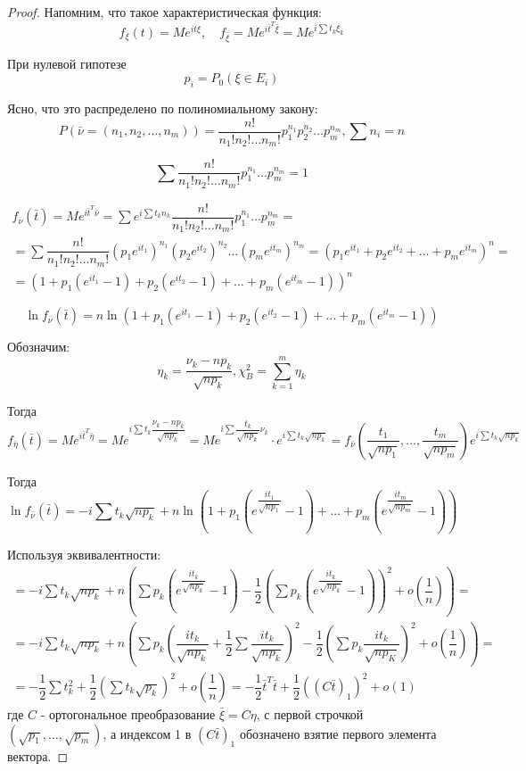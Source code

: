\begin{proof}
  Напомним, что такое характеристическая функция:
  \[
    f_\xi (t) = M e^{i t \xi},\quad f_{\bar \xi} = M e^{i \bar t^T \bar \xi} = M e^{i \sum t_k \xi_k}
  \]

  При нулевой гипотезе
  \[
    p_i = P_0 (\xi \in E_i)
  \]

  Ясно, что это распределено по полиномиальному закону:
  \[
    P(\bar \nu = (n_1, n_2, \dots, n_m)) = \dfrac{n!}{n_1! n_2! \dots n_m!} p_1^{n_1} p_2^{n_2} \dots p_m^{n_m}, \sum n_i = n
  \]

  \[
    \sum \dfrac{n!}{n_1! n_2! \dots n_m!} p_1^{n_1} \dots p_m^{n_m} = 1
  \]

  \begin{multline*}
    f_{\bar \nu} (\bar t) = M e^{i \bar t^T \bar \nu} =
    \sum e^{i \sum t_k n_k} \dfrac{n!}{n_1! n_2! \dots n_m!} p_1^{n_1} \dots p_m^{n_m} = \\
    = \sum \dfrac{n!}{n_1! n_2! \dots n_m!} (p_1 e^{i t_1})^{n_1} (p_2 e^{i t_2})^{n_2} \dots (p_m e^{i t_m})^{n_m} = 
    (p_1 e^{i t_1} + p_2 e^{i t_2} + \dots + p_m e^{i t_m})^n = \\
    = (1 + p_1 (e^{i t_1} - 1) + p_2 (e^{i t_2} - 1) + \dots + p_m (e^{i t_m} - 1))^n
  \end{multline*}

  \[
    \ln f_{\bar \nu} (\bar t) = n \ln (1 + p_1 (e^{i t_1} - 1) + p_2 (e^{i t_2} - 1) + \dots + p_m (e^{i t_m} - 1))
  \]

  Обозначим: 
  \[
    \eta_k = \dfrac{\nu_k - np_k}{\sqrt{np_k}}, \chi^2_B = \sum_{k=1}^m \eta_k
  \]

  Тогда
  \[
    f_{\bar \eta} (\bar t) = M e^{i \bar t^T \bar \eta} =
    M e^{i \sum t_k \dfrac{\nu_k - np_k}{\sqrt{np_k}}} = 
    M e^{i \sum \dfrac{t_k}{\sqrt{np_k}} \nu_k} \cdot e^{i \sum t_k \sqrt{np_k}} = 
    f_{\bar \nu} (\dfrac{t_1}{\sqrt{np_1}}, \dots, \dfrac{t_m}{\sqrt{np_m}}) e^{i \sum t_k \sqrt{np_k}}
  \]

  Тогда
  \[
    \ln f_{\bar \nu} (\bar t) = -i \sum t_k \sqrt{np_k} + n \ln (1+p_1 (e^{\dfrac{i t_1}{\sqrt{np_1}}} - 1)+ \dots + p_m (e^{\dfrac{i t_m}{\sqrt{np_m}}} - 1) )
  \]

  Используя эквивалентности:
  \begin{multline*}
    = -i \sum t_k \sqrt{np_k} + n \left( \sum p_k (e^{\dfrac{i t_k}{\sqrt{np_k}}} - 1) - \dfrac{1}{2} (\sum p_k(e^{\dfrac{i t_k}{\sqrt{np_k}}} - 1))^2 + o(\dfrac{1}{n}) \right) = \\
    = -i \sum t_k \sqrt{np_k} + n \left( \sum p_k (\dfrac{i t_k}{\sqrt{np_k}} + \dfrac{1}{2} \sum \dfrac{i t_k}{\sqrt{np_k}})^2 - \dfrac{1}{2} (\sum p_k \dfrac{i t_k}{\sqrt{np_K}})^2 + o(\dfrac{1}{n}) \right) = \\
    = - \dfrac{1}{2} \sum t_k^2 + \dfrac{1}{2} \left( \sum t_k \sqrt{p_k} \right)^2 + o\left(\dfrac{1}{n}\right)
    = - \dfrac{1}{2} \bar t^T \bar t + \dfrac{1}{2} ((C \bar t)_1)^2 + o(1)
  \end{multline*}
  где $C$ - ортогональное преобразование $\bar \xi = C \eta$, с первой строчкой $(\sqrt{p_1}, \dots, \sqrt{p_m})$,
    а индексом 1 в $(C \bar t)_1$ обозначено взятие первого элемента вектора.


\end{proof}
